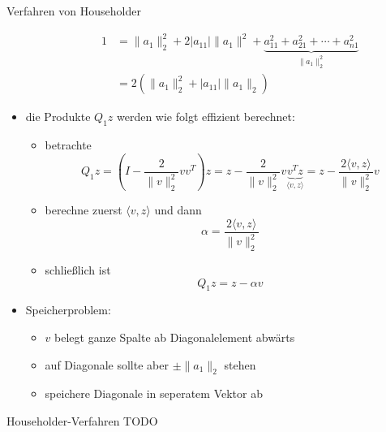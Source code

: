 \begin{defi}{Verfahren von Householder}
\begin{itemize}
\begin{itemize}
\begin{alignat*}{1}
                                      & = \|a_1\|_2^2 + 2 |a_{11}| \|a_1\|^2 + \underbrace{a_{11}^2 + a_{21}^2 + \cdots + a_{n1}^2}_{\|a_1\|_2^2} \\ 
                                      & = 2 (\|a_1\|_2^2 + |a_{11}| \|a_1\|_2)
                        \end{alignat*}
              \end{itemize}
        \item die Produkte $Q_1z$ werden wie folgt effizient berechnet:
              \begin{itemize}
                  \item betrachte
                        \[
                            Q_1z = \left( I - \frac{2}{\|v\|_2^2} vv^T \right) z = z - \frac{2}{\|v\|_2^2} v \underbrace{v^Tz}_{\langle v, z \rangle} = z - \frac{2 \langle v, z \rangle}{\|v\|_2^2} v
                        \]
                  \item berechne zuerst $\langle v, z \rangle$ und dann
                        \[ 
                            \alpha = \frac{2 \langle v, z \rangle}{\|v\|_2^2}
                        \]
                  \item schließlich ist
                        \[ 
                            Q_1 z = z - \alpha v
                        \]
              \end{itemize}
        \item Speicherproblem:
              \begin{itemize}
                  \item $v$ belegt ganze Spalte ab Diagonalelement abwärts
                  \item auf Diagonale sollte aber $\pm \|a_1\|_2$ stehen
                  \item speichere Diagonale in seperatem Vektor ab
              \end{itemize}
    \end{itemize}
\end{defi}

\begin{example}{Householder-Verfahren}
    TODO
\end{example}